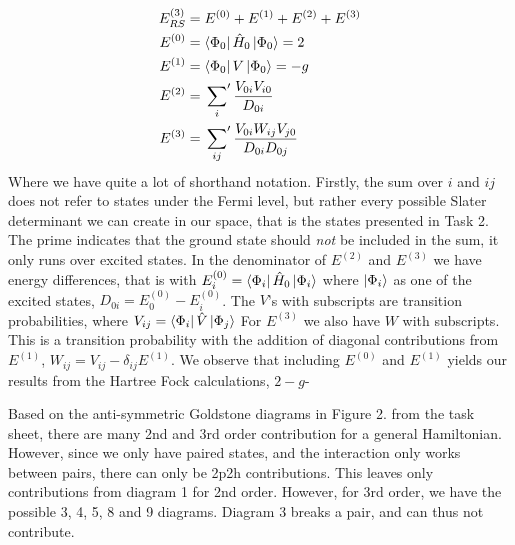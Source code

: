 \documentclass{article}
\newcommand{\inner}[3]{\bra{#1}#2\ket{#3}}
\newcommand{\ord}[2]{#1^{(#2)}}
\newcommand{\psum}{\sideset{}{'}\sum}
\begin{document}
    \begin{align*}
        \ord{E}{3}_{RS} &= \ord{E}{0} + \ord{E}{1} + \ord{E}{2} + \ord{E}{3} \\ 
        \ord{E}{0} &= \inner{\Phi_0}{\hat{H}_0}{\Phi_0} = 2 \\
        \ord{E}{1} &= \inner{\Phi_0}{V}{\Phi_0} = -g \\
        \ord{E}{2} &= \psum_{i} \frac{V_{0i}V_{i0}}{D_{0i}} \\
        \ord{E}{3} &= \psum_{ij} \frac{V_{0i}W_{ij}V_{j0}}{D_{0i}D_{0j}}
    \end{align*}
    Where we have quite a lot of shorthand notation. Firstly, the sum over $i$ and $ij$ does not refer to states under the Fermi level, but rather every possible Slater determinant we can create in our space, that is the states presented in Task 2. The prime indicates that the ground state should \textit{not} be included in the sum, it only runs over excited states. In the denominator of $\ord{E}{2}$ and $\ord{E}{3}$ we have energy differences, that is with $\ord{E}{0}_i = \inner{\Phi_i}{\hat{H}_0}{\Phi_i}$ where $\ket{\Phi_i}$ as one of the excited states, $D_{0i} = \ord{E}{0}_0 - \ord{E}{0}_i$. The $V$'s with subscripts are transition probabilities, where $V_{ij} = \inner{\Phi_i}{\hat{V}}{\Phi_j}$ For $\ord{E}{3}$ we also have $W$ with subscripts. This is a transition probability with the addition of diagonal contributions from $\ord{E}{1}$, $W_{ij} = V_{ij} - \delta_{ij}\ord{E}{1}$. We observe that including $\ord{E}{0}$ and $\ord{E}{1}$ yields our results from the Hartree Fock calculations, $2-g$- 
    
    Based on the anti-symmetric Goldstone diagrams in Figure 2. from the task sheet, there are many 2nd and 3rd order contribution for a general Hamiltonian. However, since we only have paired states, and the interaction only works between pairs, there can only be 2p2h contributions. This leaves only contributions from diagram 1 for 2nd order. However, for 3rd order, we have the possible 3, 4, 5, 8 and 9 diagrams. Diagram 3 breaks a pair, and can thus not contribute.  
\end{document}
